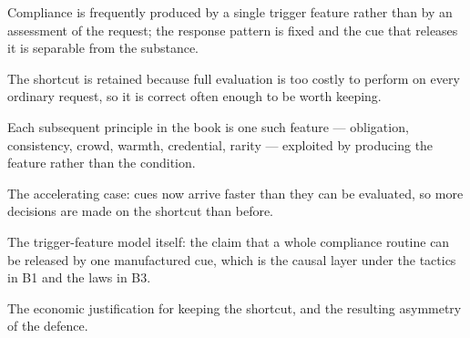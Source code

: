 

\begin{distilled}
  \item Compliance is frequently produced by a single trigger feature rather than by an assessment of the request; the response pattern is fixed and the cue that releases it is separable from the substance.
  \item The shortcut is retained because full evaluation is too costly to perform on every ordinary request, so it is correct often enough to be worth keeping.
  \item Each subsequent principle in the book is one such feature --- obligation, consistency, crowd, warmth, credential, rarity --- exploited by producing the feature rather than the condition.
  \item The accelerating case: cues now arrive faster than they can be evaluated, so more decisions are made on the shortcut than before.
\end{distilled}

\begin{unique}
  \item The trigger-feature model itself: the claim that a whole compliance routine can be released by one manufactured cue, which is the causal layer under the tactics in B1 and the laws in B3.
  \item The economic justification for keeping the shortcut, and the resulting asymmetry of the defence.
\end{unique}

